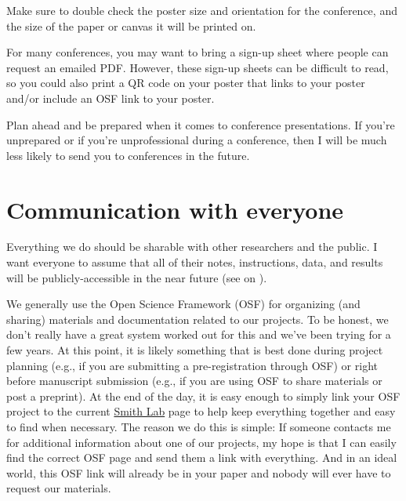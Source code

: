 \documentclass[letterpaper,11pt,oneside]{memoir}
\begin{document}
Make sure to double check the poster size and orientation for the conference, and the size of the paper or canvas it will be printed on.

For many conferences, you may want to bring a sign-up sheet where people can request an emailed PDF. However, these sign-up sheets can be difficult to read, so you could also print a QR code on your poster that links to your poster and/or include an OSF link to your poster.

\begin{shaded}
\noindent Plan ahead and be prepared when it comes to conference presentations. If you're unprepared or if you're unprofessional during a conference, then I will be much less likely to send you to conferences in the future.
\end{shaded}


\section{Communication with everyone}
Everything we do should be sharable with other researchers and the public. I want everyone to assume that all of their notes, instructions, data, and results will be publicly-accessible in the near future (see  on ). 


We generally use the Open Science Framework (OSF) for organizing (and sharing) materials and documentation related to our projects. To be honest, we don't really have a great system worked out for this and we've been trying for a few years. At this point, it is likely something that is best done during project planning (e.g., if you are submitting a pre-registration through OSF) or right before manuscript submission (e.g., if you are using OSF to share materials or post a preprint). At the end of the day, it is easy enough to simply link your OSF project to the current \href{https://osf.io/myxet/}{Smith Lab} page to help keep everything together and easy to find when necessary. The reason we do this is simple: If someone contacts me for additional information about one of our projects, my hope is that I can easily find the correct OSF page and send them a link with everything. And in an ideal world, this OSF link will already be in your paper and nobody will ever have to request our materials. 
\end{document}
